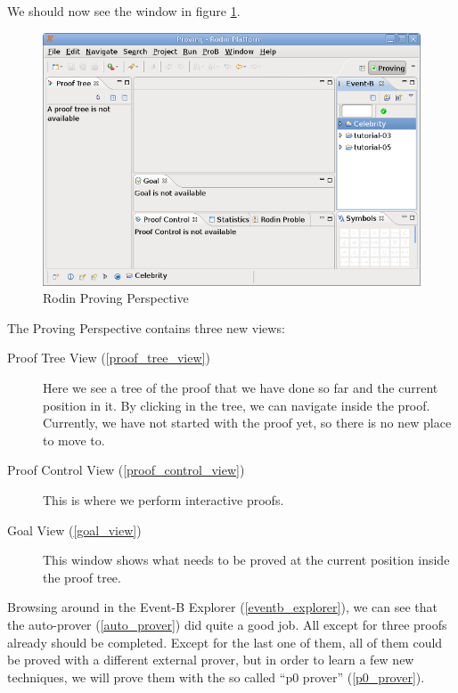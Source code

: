 We should now see the window in figure \ref{fig_tut_08_proving_perspective}. 

\begin{figure}[!h]
\begin{center}
	\includegraphics{img/tutorial/tut_08_proving_perspective.png}
	\caption{Rodin Proving Perspective}
	\label{fig_tut_08_proving_perspective}
\end{center}
\end{figure}

The Proving Perspective contains three new views:

\begin{description}
	\item[Proof Tree View (\ref{proof_tree_view})] Here we see a tree of the proof that we have done so far and the current position in it. By clicking in the tree, we can navigate inside the proof. Currently, we have not started with the proof yet, so there is no new place to move to. 
	\item[Proof Control View (\ref{proof_control_view})] This is where we perform interactive proofs.
	\item[Goal View (\ref{goal_view})] This window shows what needs to be proved at the current position inside the proof tree.
\end{description}

Browsing around in the Event-B Explorer (\ref{eventb_explorer}), we can see that the auto-prover (\ref{auto_prover}) did quite a good job. All except for three proofs already should be completed. Except for the last one of them, all of them could be proved with a different external prover, but in order to learn a few new techniques, we will prove them with the so called ``p0 prover'' (\ref{p0_prover}).

